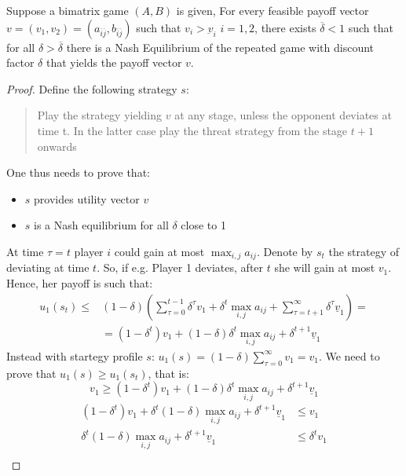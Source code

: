 \documentclass[../main.tex]{subfiles}
\begin{document}
\begin{theorem}
    Suppose a bimatrix game $(A,B)$ is given, For every feasible payoff vector $v = (v_1,v_2) = (a_{\overline{i} \overline{j}}, b_{\overline{i} \overline{j}})$ such that $v_i > \underbar{v}_i$ $i =1,2$, there exists $\overline{\delta} < 1$ such that for all $\delta > \overline{\delta}$ there is a Nash Equilibrium of the repeated game with discount factor $\delta$ that yields the payoff vector $v$.
\end{theorem}

\begin{proof}
    Define the following strategy $s$: \begin{quote}
        Play the strategy yielding $v$ at any stage, unless the opponent deviates at time t. In the latter case play the threat strategy from the stage $t + 1$ onwards
    \end{quote}
    One thus needs to prove that:
    \begin{itemize}
        \item $s$ provides utility vector $v$
        \item $s$ is a Nash equilibrium for all $\delta$ close to 1
    \end{itemize}
    At time $\tau = t$ player $i$ could gain at most $\max_{i,j} a_{ij}$. Denote by $s_t$ the strategy of deviating at time $t$. So, if e.g. Player 1 deviates, after $t$ she will gain at most $v_1$. Hence, her payoff is such that:
    \begin{align*}
        u_1(s_t) \leq & (1-\delta) \left( \sum_{\tau = 0}^{t-1} \delta^\tau v_1 + \delta^t \max_{i,j} a_{ij} + \sum_{\tau = t+1}^{\infty} \delta^\tau \underline{v}_1 \right) = \\
                      & = (1-\delta^t) v_1 + (1-\delta)\delta^t \max_{i,j} a_{ij} + \delta^{t+1} \underline{v}_1
    \end{align*}
    Instead with startegy profile $s$: $u_1(s) =(1-\delta)\sum_{\tau=0}^{\infty} v_1 = v_1$. We need to prove that $u_1(s) \geq u_1(s_t)$, that is:
    \begin{equation*}
        v_1 \geq (1-\delta^t) v_1 + (1-\delta)\delta^t \max_{i,j} a_{ij} + \delta^{t+1} \underline{v}_1
    \end{equation*}
    \begin{align*}
        (1-\delta^t)v_1 + \delta^t(1-\delta)\max_{i,j} a_{ij} + \delta^{t+1} \underline{v}_1 & \leq v_1                     \\
        \delta^t(1-\delta)\max_{i,j} a_{ij} + \delta^{t+1} \underline{v}_1                   & \leq \delta^t v_1            \\

\end{align*}
\end{proof}
\end{document}
